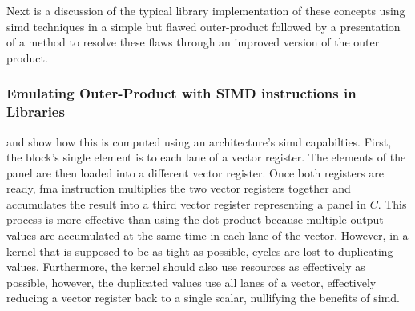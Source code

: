 \documentclass[\main/thesis.tex]{subfiles}
\begin{document}
Next is a discussion of the typical library implementation of these concepts using \gls{simd} techniques in a simple but flawed outer-product followed by a presentation of a method to resolve these flaws through an improved version of the outer product.

\subsubsection{Emulating Outer-Product with SIMD instructions in Libraries}
 and  show how this is computed using an architecture's \gls{simd} capabilties.
First, the block's single element is  to each \gls{lane} of a vector register.
The elements of the panel are then loaded into a different vector register.
Once both registers are ready,  \gls{fma} instruction multiplies the two vector registers together and accumulates the result into a third vector register representing a panel in $C$.
This process is more effective than using the dot product because multiple output values are accumulated at the same time in each \gls{lane} of the vector.
However, in a kernel that is supposed to be as tight as possible, cycles are lost to duplicating values.
Furthermore, the kernel should also use resources as effectively as possible, however, the duplicated values use all \glspl{lane} of a vector, effectively reducing a vector register back to a single scalar, nullifying the benefits of \gls{simd}.
\end{document}

